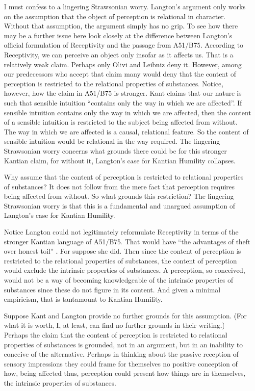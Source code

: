 I must confess to a lingering Strawsonian worry. Langton's argument only works on the assumption that the object of perception is relational in character. Without that assumption, the argument simply has no grip. To see how there may be a further issue here look closely at the difference between Langton's official formulation of Receptivity and the passage from A51/B75. According to Receptivity, we can perceive an object only insofar as it affects us. That is a relatively weak claim. Perhaps only Olivi and Leibniz deny it. However, among our predecessors who accept that claim many would deny that the content of perception is restricted to the relational properties of substances. Notice, however, how the claim in A51/B75 is stronger. Kant claims that our nature is such that sensible intuition ``contains only the way in which we are affected''. If sensible intuition contains only the way in which we are affected, then the content of a sensible intuition is restricted to the subject being affected from without. The way in which we are affected is a causal, relational feature. So the content of sensible intuition would be relational in the way required. The lingering Strawsonian worry concerns what grounds there could be for this stronger Kantian claim, for without it, Langton's case for Kantian Humility collapses. 

Why assume that the content of perception is restricted to relational properties of substances? It does not follow from the mere fact that perception requires being affected from without. So what grounds this restriction? The lingering Strawsonian worry is that this is a fundamental and unargued assumption of Langton's case for Kantian Humility.

Notice Langton could not legitimately reformulate Receptivity in terms of the stronger Kantian language of A51/B75. That would have ``the advantages of theft over honest toil'' \citep[71]{Russell1919Introduction-to}. For suppose she did. Then since the content of perception is restricted to the relational properties of substances, the content of perception would exclude the intrinsic properties of substances. A perception, so conceived, would not be a way of becoming knowledgeable of the intrinsic properties of substances since these do not figure in its content. And given a minimal empiricism, that is tantamount to Kantian Humility.

Suppose Kant and Langton provide no further grounds for this assumption. (For what it is worth, I, at least, can find no further grounds in their writing.) Perhaps the claim that the content of perception is restricted to relational properties of substances is grounded, not in an argument, but in an inability to conceive of the alternative. Perhaps in thinking about the passive reception of sensory impressions they could frame for themselves no positive conception of how, being affected thus, perception could present how things are in themselves, the intrinsic properties of substances.

